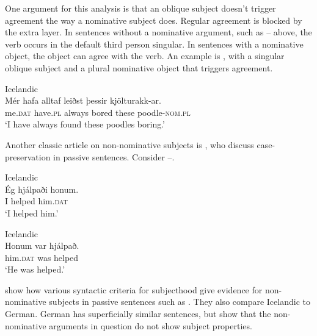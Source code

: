 \documentclass[output=paper,hidelinks]{langscibook}
\begin{document}

\noindent One argument for this analysis is that an oblique subject doesn't trigger agreement the way a nominative subject does. Regular agreement is blocked by the extra layer. In sentences without a nominative argument, such as -- above, the verb occurs in the default third person singular. In sentences with a nominative object, the object can agree with the verb. An example is , with a singular oblique subject and a plural nominative object that triggers agreement.



\ea\label{ex:Scandinavian:38} Icelandic \citep[156]{Thrainsson07}\\
\gll
 {Mér} {hafa} {alltaf} {leiðst} {þessir} {kjölturakk-ar.} \\
 me\textsc{.dat} have.\textsc{pl} always bored these poodle\textsc{{}-nom}.\textsc{pl}\\
\glt `I have always found these poodles boring.'\z

\noindent Another classic article on non-nominative subjects is \citet{ZMT85:Case}, who discuss case-preservation in passive sentences. Consider --.



\ea\label{ex:Scandinavian:39} Icelandic \citep[96]{ZMT85:Case}\\
\gll
 {Ég} {hjálpaði} {honum.}\\
 I helped him\textsc{.dat}\\
\glt `I helped him.'\z



\ea\label{ex:Scandinavian:40} Icelandic \citep[98]{ZMT85:Case}\\
\gll
 {Honum} {var} {hjálpað.}\\
 him\textsc{.dat} was helped\\
\glt `He was helped.'\z

\noindent \citet{ZMT85:Case} show how various syntactic criteria for subjecthood give evidence for non-nominative subjects in passive sentences such as . They also compare Icelandic to German. German has superficially similar sentences, but \citet{ZMT85:Case} show that the non-nominative arguments in question do not show subject properties.
\end{document}
